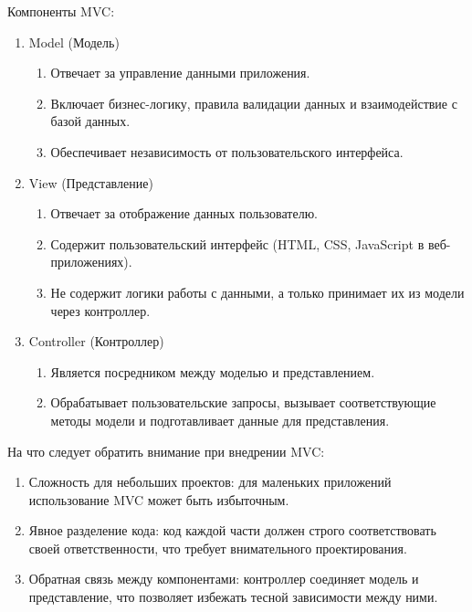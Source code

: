 \documentclass[pract]{SCWorks}
\begin{document}
Компоненты MVC:
\begin{enumerate}
    \item Model (Модель)
    \begin{enumerate}
        \item Отвечает за управление данными приложения.
        \item Включает бизнес-логику, правила валидации данных и 
        взаимодействие с базой данных.
        \item Обеспечивает независимость от пользовательского интерфейса.    
    \end{enumerate}

    \item View (Представление)
    \begin{enumerate}
        \item Отвечает за отображение данных пользователю.
        \item Содержит пользовательский интерфейс (HTML, CSS, JavaScript в 
        веб-приложениях).
        \item Не содержит логики работы с данными, а только принимает их из 
        модели через контроллер.
    \end{enumerate}

    \item Controller (Контроллер)
    \begin{enumerate}
        \item Является посредником между моделью и представлением.
        \item Обрабатывает пользовательские запросы, вызывает соответствующие 
        методы модели и подготавливает данные для представления.
    \end{enumerate}    
\end{enumerate}
    
На что следует обратить внимание при внедрении MVC:
\begin{enumerate}
    \item Сложность для небольших проектов: для маленьких приложений 
    использование MVC может быть избыточным.
    \item Явное разделение кода: код каждой части должен строго 
    соответствовать своей ответственности, что требует внимательного 
    проектирования.
    \item Обратная связь между компонентами: контроллер соединяет модель и 
    представление, что позволяет избежать тесной зависимости между ними.
\end{enumerate}
\end{document}
